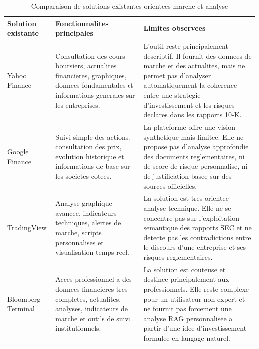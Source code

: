 \begin{table}[htbp]
\centering
\scriptsize
\setlength{\tabcolsep}{3pt}
\renewcommand{\arraystretch}{1.25}
\begin{tabular}{|p{3cm}|p{4cm}|p{6cm}|}
\hline
\textbf{Solution existante} & \textbf{Fonctionnalites principales} & \textbf{Limites observees} \\
\hline
Yahoo Finance &
Consultation des cours boursiers, actualites financieres, graphiques, donnees
fondamentales et informations generales sur les entreprises. &
L'outil reste principalement descriptif. Il fournit des donnees de marche et des
actualites, mais ne permet pas d'analyser automatiquement la coherence entre une
strategie d'investissement et les risques declares dans les rapports 10-K. \\
\hline
Google Finance &
Suivi simple des actions, consultation des prix, evolution historique et informations
de base sur les societes cotees. &
La plateforme offre une vision synthetique mais limitee. Elle ne propose pas
d'analyse approfondie des documents reglementaires, ni de score de risque
personnalise, ni de justification basee sur des sources officielles. \\
\hline
TradingView &
Analyse graphique avancee, indicateurs techniques, alertes de marche, scripts
personnalises et visualisation temps reel. &
La solution est tres orientee analyse technique. Elle ne se concentre pas sur
l'exploitation semantique des rapports SEC et ne detecte pas les contradictions entre
le discours d'une entreprise et ses risques reglementaires. \\
\hline
Bloomberg Terminal &
Acces professionnel a des donnees financieres tres completes, actualites, analyses,
indicateurs de marche et outils de suivi institutionnels. &
La solution est couteuse et destinee principalement aux professionnels. Elle reste
complexe pour un utilisateur non expert et ne fournit pas forcement une analyse RAG
personnalisee a partir d'une idee d'investissement formulee en langage naturel. \\
\hline
\end{tabular}
\caption{Comparaison de solutions existantes orientees marche et analyse}
\label{tab:etude-existant-marche}
\end{table}

